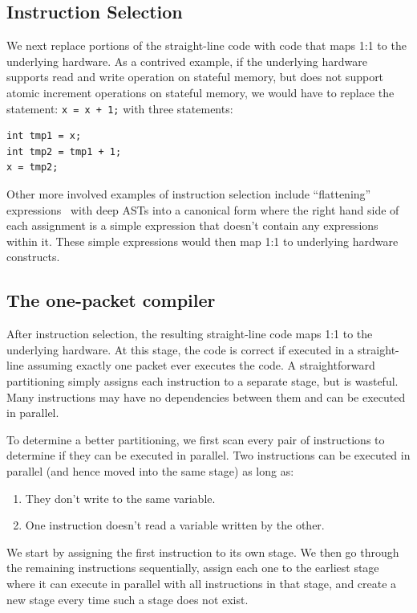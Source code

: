 \subsection{Instruction Selection}
We next replace portions of the straight-line code with code that maps 1:1 to
the underlying hardware. As a contrived example, if the underlying hardware
supports read and write operation on stateful memory, but does not support
atomic increment operations on stateful memory, we would have to replace the
statement: \texttt{x = x + 1;} with three statements:
\begin{verbatim}
int tmp1 = x;
int tmp2 = tmp1 + 1;
x = tmp2;
\end{verbatim}

Other more involved examples of instruction selection include ``flattening''
expressions~\cite{expression_flattening} with deep ASTs into a canonical form
where the right hand side of each assignment is a simple expression that
doesn't contain any expressions within it. These simple expressions would then
map 1:1 to underlying hardware constructs.

\subsection{The one-packet compiler}
After instruction selection, the resulting straight-line code maps 1:1 to the
underlying hardware. At this stage, the code is correct if executed in a
straight-line assuming exactly one packet ever executes the code. A
straightforward partitioning simply assigns each instruction to a separate
stage, but is wasteful. Many instructions may have no dependencies between them
and can be executed in parallel.

To determine a better partitioning, we first scan every pair of instructions
to determine if they can be executed in parallel. Two instructions can be
executed in parallel (and hence moved into the same stage) as long as:
\begin{enumerate}
\item They don't write to the same variable.
\item One instruction doesn't read a variable written by the other.
\end{enumerate}
We start by assigning the first instruction to its own stage. We then go
through the remaining instructions sequentially, assign each one to the
earliest stage where it can execute in parallel with all instructions in that
stage, and create a new stage every time such a stage does not exist.

